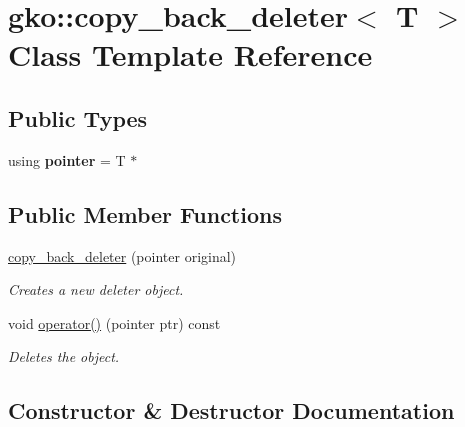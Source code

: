 \hypertarget{classgko_1_1copy__back__deleter}{}\section{gko\+:\+:copy\+\_\+back\+\_\+deleter$<$ T $>$ Class Template Reference}
\label{classgko_1_1copy__back__deleter}
\subsection*{Public Types}
\begin{DoxyCompactItemize}
\item 
\mbox{\label{classgko_1_1copy__back__deleter_a55bb1515ad3849a704abb253a8cbb061}} 
using {\bfseries pointer} = T $\ast$
\end{DoxyCompactItemize}
\subsection*{Public Member Functions}
\begin{DoxyCompactItemize}
\item 
\hyperlink{classgko_1_1copy__back__deleter_affa618330dcb3a4e3aeaffb69c39df5f}{copy\+\_\+back\+\_\+deleter} (pointer original)
\begin{DoxyCompactList}\small\item\em Creates a new deleter object. \end{DoxyCompactList}\item 
void \hyperlink{classgko_1_1copy__back__deleter_a34bba76c78c23dccd814969e98c78b1b}{operator()} (pointer ptr) const
\begin{DoxyCompactList}\small\item\em Deletes the object. \end{DoxyCompactList}\end{DoxyCompactItemize}


\subsection{Constructor \& Destructor Documentation}
\mbox{\label{classgko_1_1copy__back__deleter_affa618330dcb3a4e3aeaffb69c39df5f}} 
